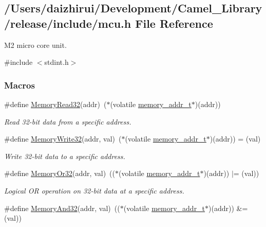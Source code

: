 \hypertarget{a00020}{}\subsection{/\+Users/daizhirui/\+Development/\+Camel\+\_\+\+Library/release/include/mcu.h File Reference}
\label{a00020}


M2 micro core unit.  


{\ttfamily \#include $<$stdint.\+h$>$}\newline
\subsubsection*{Macros}
\begin{DoxyCompactItemize}
\item 
\#define \mbox{\hyperlink{a00020_a2d484dc15bdf30ee11ab3b05f31f0e16}{Memory\+Read32}}(addr)~($\ast$(volatile \mbox{\hyperlink{a00020_a06da901348542a481c297d9b700e2001}{memory\+\_\+addr\+\_\+t}}$\ast$)(addr))
\begin{DoxyCompactList}\small\item\em Read 32-\/bit data from a specific address. \end{DoxyCompactList}\item 
\#define \mbox{\hyperlink{a00020_a6b9732365b12e48ddb89fe1028b975b0}{Memory\+Write32}}(addr,  val)~($\ast$(volatile \mbox{\hyperlink{a00020_a06da901348542a481c297d9b700e2001}{memory\+\_\+addr\+\_\+t}}$\ast$)(addr)) = (val)
\begin{DoxyCompactList}\small\item\em Write 32-\/bit data to a specific address. \end{DoxyCompactList}\item 
\#define \mbox{\hyperlink{a00020_a27874a97deab7cecdde5ddecf466e31e}{Memory\+Or32}}(addr,  val)~(($\ast$(volatile \mbox{\hyperlink{a00020_a06da901348542a481c297d9b700e2001}{memory\+\_\+addr\+\_\+t}}$\ast$)(addr)) $\vert$= (val))
\begin{DoxyCompactList}\small\item\em Logical OR operation on 32-\/bit data at a specific address. \end{DoxyCompactList}\item 
\#define \mbox{\hyperlink{a00020_ad87cedffcaadc51db22594fce55173d4}{Memory\+And32}}(addr,  val)~(($\ast$(volatile \mbox{\hyperlink{a00020_a06da901348542a481c297d9b700e2001}{memory\+\_\+addr\+\_\+t}}$\ast$)(addr)) \&= (val))

\end{DoxyCompactItemize}

